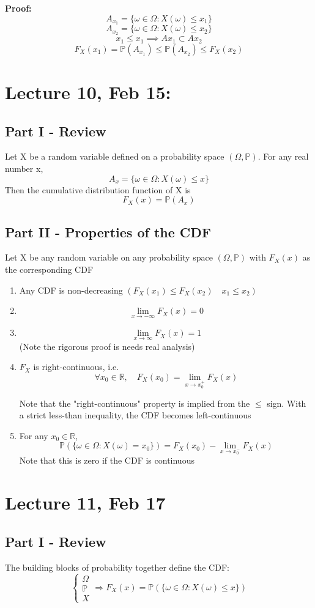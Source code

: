 \documentclass[12pt]{article}
\renewcommand{\P}{\mathbb{P}}
\begin{document}
\textbf{Proof:} 
\[A_{x_1} = \{\omega \in \Omega : X(\omega) \leq x_1\}\]
\[A_{x_2} = \{\omega \in \Omega : X(\omega) \leq x_2\}\]
\[x_1 \leq x_1 \implies Ax_1 \subset Ax_2\]
\[F_X(x_1) = \P(A_{x_1}) \leq \P(A_{x_2}) \leq F_X(x_2)\]

\section*{Lecture 10, Feb 15: }
\subsection*{Part I - Review}
Let X be a random variable defined on a probability space $(\Omega, \P)$.
For any real number x, 
\[A_x = \{\omega \in \Omega : X(\omega) \leq x\}\]
Then the cumulative distribution function of X is
\[F_X(x) = \P(A_x)\]

\subsection*{Part II - Properties of the CDF}
Let X be any random variable on any probability space $(\Omega, \P)$ with $F_X(x)$ as the corresponding CDF

\begin{enumerate}
    \item Any CDF is non-decreasing $(F_X(x_1) \leq F_X(x_2) \quad x_1 \leq x_2)$
    \item \[\lim_{x \to -\infty} F_X(x) = 0\]
    \item \[\lim_{x \to \infty} F_X(x) = 1\]
    (Note the rigorous proof is needs real analysis)
    \item $F_X$ is right-continuous, i.e. \[\forall x_0 \in \mathbb{R},\quad F_X(x_0) = \lim_{x \to x_0^+} F_X(x)\]

    Note that the "right-continuous" property is implied from the $\leq$ sign. With a strict less-than inequality, the CDF becomes left-continuous

    \item For any $x_0 \in \mathbb{R}$, 
    \[\P(\{\omega \in \Omega : X(\omega) = x_0\}) = F_X(x_0) - \lim_{x \to x_0^-} F_X(x)\]
    Note that this is zero if the CDF is continuous
\end{enumerate}

\section*{Lecture 11, Feb 17}
\subsection*{Part I - Review}
The building blocks of probability together define the CDF:
\[\begin{cases}
    \Omega\\
    \P\\
    X
\end{cases} \Longrightarrow F_X(x) = \P(\{\omega \in \Omega : X(\omega) \leq x\})\]
\end{document}
